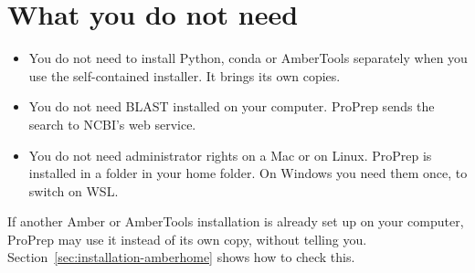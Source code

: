 \section{What you do not need}
\label{sec:requirements-not}

\begin{itemize}
  \item You do not need to install Python, conda or AmberTools separately when
        you use the self-contained installer. It brings its own copies.
  \item You do not need BLAST installed on your computer. ProPrep sends the
        search to NCBI's web service.
  \item You do not need administrator rights on a Mac or on Linux. ProPrep is
        installed in a folder in your home folder. On Windows you need them
        once, to switch on WSL.
\end{itemize}

\begin{watchout}
If another Amber or AmberTools installation is already set up on your
computer, ProPrep may use it instead of its own copy, without telling you.
Section~\ref{sec:installation-amberhome} shows how to check this.
\end{watchout}
